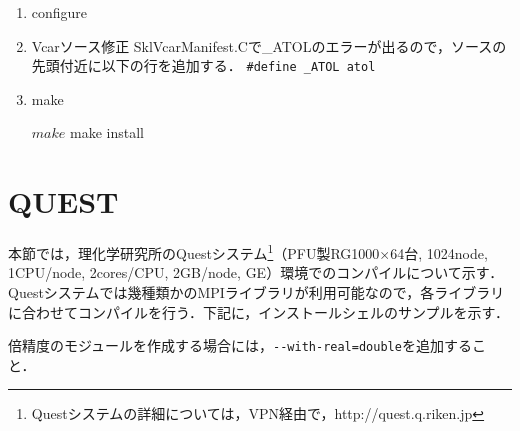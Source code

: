 \begin{enumerate}
\item configure
{\small
{}
}

\item Vcarソース修正
SklVcarManifest.Cで\_ATOLのエラーが出るので，ソースの先頭付近に以下の行を追加する．
\small \verb|#define _ATOL atol|

\item make
{\small
\begin{program}
$ make
$ make install
\end{program}
}

\end{enumerate}


%
\section{QUEST}
\label{sec:install_quest}
本節では，理化学研究所のQuestシステム\footnote{Questシステムの詳細については，VPN経由で，http://quest.q.riken.jp}（PFU製RG1000$\times$64台, 1024node, 1CPU/node, 2cores/CPU, 2GB/node, GE）環境でのコンパイルについて示す．
Questシステムでは幾種類かのMPIライブラリが利用可能なので，各ライブラリに合わせてコンパイルを行う．下記に，インストールシェルのサンプルを示す．

倍精度のモジュールを作成する場合には，\verb|--with-real=double|を追加すること．

